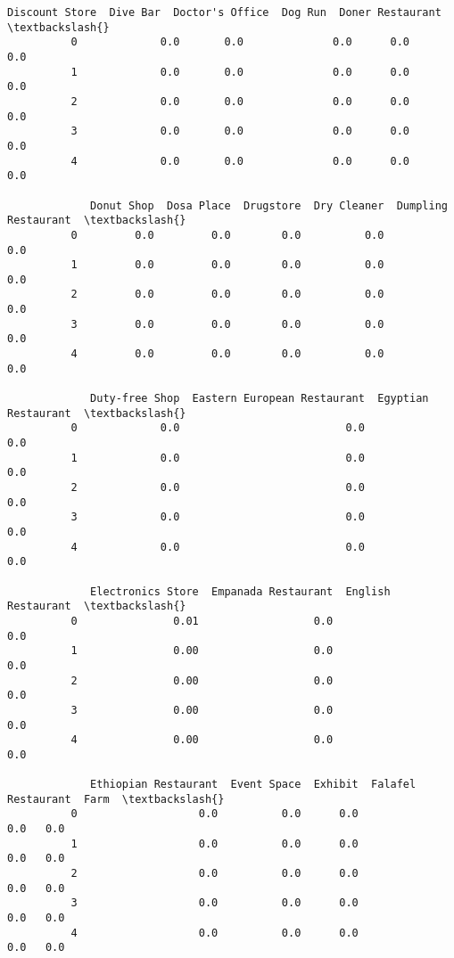 \documentclass[11pt]{article}
\begin{document}
\begin{Verbatim}[commandchars=\\\{\}]
             Discount Store  Dive Bar  Doctor's Office  Dog Run  Doner Restaurant  \textbackslash{}
          0             0.0       0.0              0.0      0.0               0.0   
          1             0.0       0.0              0.0      0.0               0.0   
          2             0.0       0.0              0.0      0.0               0.0   
          3             0.0       0.0              0.0      0.0               0.0   
          4             0.0       0.0              0.0      0.0               0.0   
          
             Donut Shop  Dosa Place  Drugstore  Dry Cleaner  Dumpling Restaurant  \textbackslash{}
          0         0.0         0.0        0.0          0.0                  0.0   
          1         0.0         0.0        0.0          0.0                  0.0   
          2         0.0         0.0        0.0          0.0                  0.0   
          3         0.0         0.0        0.0          0.0                  0.0   
          4         0.0         0.0        0.0          0.0                  0.0   
          
             Duty-free Shop  Eastern European Restaurant  Egyptian Restaurant  \textbackslash{}
          0             0.0                          0.0                  0.0   
          1             0.0                          0.0                  0.0   
          2             0.0                          0.0                  0.0   
          3             0.0                          0.0                  0.0   
          4             0.0                          0.0                  0.0   
          
             Electronics Store  Empanada Restaurant  English Restaurant  \textbackslash{}
          0               0.01                  0.0                 0.0   
          1               0.00                  0.0                 0.0   
          2               0.00                  0.0                 0.0   
          3               0.00                  0.0                 0.0   
          4               0.00                  0.0                 0.0   
          
             Ethiopian Restaurant  Event Space  Exhibit  Falafel Restaurant  Farm  \textbackslash{}
          0                   0.0          0.0      0.0                 0.0   0.0   
          1                   0.0          0.0      0.0                 0.0   0.0   
          2                   0.0          0.0      0.0                 0.0   0.0   
          3                   0.0          0.0      0.0                 0.0   0.0   
          4                   0.0          0.0      0.0                 0.0   0.0   
          

\end{Verbatim}
\end{document}
